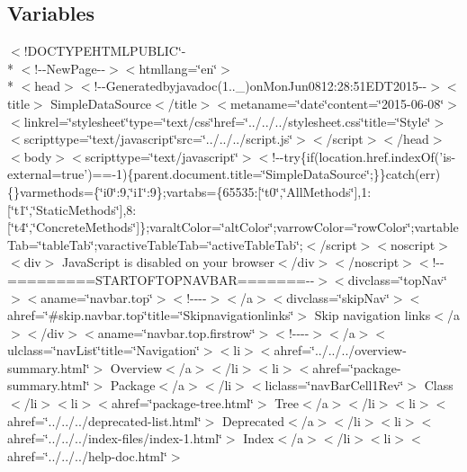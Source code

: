 \subsection*{Variables}
\begin{DoxyCompactItemize}
\item 
$<$!D\-O\-C\-T\-Y\-P\-E\-H\-T\-M\-L\-P\-U\-B\-L\-I\-C\char`\"{}-\/\\*
$<$!-\/-\/New\-Page-\/-\/$>$$<$htmllang=\char`\"{}en\char`\"{}$>$\\*
$<$head$>$$<$!-\/-\/Generatedbyjavadoc(1..\-\_)on\-Mon\-Jun0812\-:28\-:51\-E\-D\-T2015-\/-\/$>$$<$title$>$ Simple\-Data\-Source$<$/title$>$$<$metaname=\char`\"{}date\char`\"{}content=\char`\"{}2015-\/06-\/08\char`\"{}$>$$<$linkrel=\char`\"{}stylesheet\char`\"{}type=\char`\"{}text/css\char`\"{}href=\char`\"{}../../../stylesheet.\-css\char`\"{}title=\char`\"{}\-Style\char`\"{}$>$$<$scripttype=\char`\"{}text/javascript\char`\"{}src=\char`\"{}../../../script.\-js\char`\"{}$>$$<$/script$>$$<$/head$>$$<$body$>$$<$scripttype=\char`\"{}text/javascript\char`\"{}$>$$<$!-\/-\/try\{if(location.\-href.\-index\-Of('is-\/external=true')==-\/1)\{parent.\-document.\-title=\char`\"{}\-Simple\-Data\-Source\char`\"{};\}\}catch(err)\{\}varmethods=\{\char`\"{}i0\char`\"{}\-:9,\char`\"{}i1\char`\"{}\-:9\};vartabs=\{65535\-:\mbox{[}\char`\"{}t0\char`\"{},\char`\"{}\-All\-Methods\char`\"{}\mbox{]},1\-:\mbox{[}\char`\"{}t1\char`\"{},\char`\"{}\-Static\-Methods\char`\"{}\mbox{]},8\-:\mbox{[}\char`\"{}t4\char`\"{},\char`\"{}\-Concrete\-Methods\char`\"{}\mbox{]}\};varalt\-Color=\char`\"{}alt\-Color\char`\"{};varrow\-Color=\char`\"{}row\-Color\char`\"{};vartable\-Tab=\char`\"{}table\-Tab\char`\"{};varactive\-Table\-Tab=\char`\"{}active\-Table\-Tab\char`\"{};$<$/script$>$$<$noscript$>$$<$div$>$ Java\-Script is disabled on your browser$<$/div$>$$<$/noscript$>$$<$!-\/-\/=========\-S\-T\-A\-R\-T\-O\-F\-T\-O\-P\-N\-A\-V\-B\-A\-R=======-\/-\/$>$$<$divclass=\char`\"{}top\-Nav\char`\"{}$>$$<$aname=\char`\"{}navbar.\-top\char`\"{}$>$$<$!-\/-\/-\/-\/$>$$<$/a$>$$<$divclass=\char`\"{}skip\-Nav\char`\"{}$>$$<$ahref=\char`\"{}\#skip.\-navbar.\-top\char`\"{}title=\char`\"{}\-Skipnavigationlinks\char`\"{}$>$ Skip navigation links$<$/a$>$$<$/div$>$$<$aname=\char`\"{}navbar.\-top.\-firstrow\char`\"{}$>$$<$!-\/-\/-\/-\/$>$$<$/a$>$$<$ulclass=\char`\"{}nav\-List\char`\"{}title=\char`\"{}\-Navigation\char`\"{}$>$$<$li$>$$<$ahref=\char`\"{}../../../overview-\/summary.\-html\char`\"{}$>$ Overview$<$/a$>$$<$/li$>$$<$li$>$$<$ahref=\char`\"{}package-\/summary.\-html\char`\"{}$>$ Package$<$/a$>$$<$/li$>$$<$liclass=\char`\"{}nav\-Bar\-Cell1\-Rev\char`\"{}$>$ Class$<$/li$>$$<$li$>$$<$ahref=\char`\"{}package-\/tree.\-html\char`\"{}$>$ Tree$<$/a$>$$<$/li$>$$<$li$>$$<$ahref=\char`\"{}../../../deprecated-\/list.\-html\char`\"{}$>$ Deprecated$<$/a$>$$<$/li$>$$<$li$>$$<$ahref=\char`\"{}../../../index-\/files/index-\/1.\-html\char`\"{}$>$ Index$<$/a$>$$<$/li$>$$<$li$>$$<$ahref=\char`\"{}../../../help-\/doc.\-html\char`\"{}$>$ $$
\end{DoxyCompactItemize}
